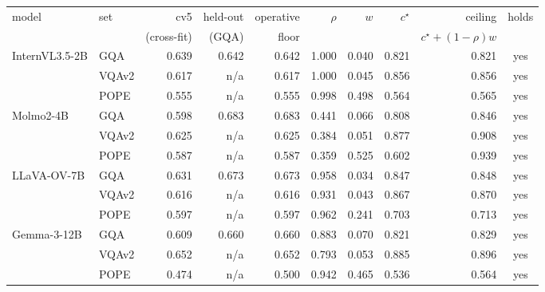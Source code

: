 \footnotesize
\setlength{\tabcolsep}{3.5pt}
\begin{tabular}{@{}llrrrrrrrc@{}}
\toprule
model & set & cv5 & held-out & operative & $\rho$ & $w$ & $c^{\star}$ & ceiling & holds \\
 &  & (cross-fit) & (GQA) & floor &  &  &  & $c^{\star}\!+\!(1\!-\!\rho)w$ &  \\
\midrule
\multirow{3}{*}{InternVL3.5-2B} & GQA & 0.639 & 0.642 & 0.642 & 1.000 & 0.040 & 0.821 & 0.821 & yes \\
 & VQAv2 & 0.617 & n/a & 0.617 & 1.000 & 0.045 & 0.856 & 0.856 & yes \\
 & POPE & 0.555 & n/a & 0.555 & 0.998 & 0.498 & 0.564 & 0.565 & yes \\
\midrule
\multirow{3}{*}{Molmo2-4B} & GQA & 0.598 & 0.683 & 0.683 & 0.441 & 0.066 & 0.808 & 0.846 & yes \\
 & VQAv2 & 0.625 & n/a & 0.625 & 0.384 & 0.051 & 0.877 & 0.908 & yes \\
 & POPE & 0.587 & n/a & 0.587 & 0.359 & 0.525 & 0.602 & 0.939 & yes \\
\midrule
\multirow{3}{*}{LLaVA-OV-7B} & GQA & 0.631 & 0.673 & 0.673 & 0.958 & 0.034 & 0.847 & 0.848 & yes \\
 & VQAv2 & 0.616 & n/a & 0.616 & 0.931 & 0.043 & 0.867 & 0.870 & yes \\
 & POPE & 0.597 & n/a & 0.597 & 0.962 & 0.241 & 0.703 & 0.713 & yes \\
\midrule
\multirow{3}{*}{Gemma-3-12B} & GQA & 0.609 & 0.660 & 0.660 & 0.883 & 0.070 & 0.821 & 0.829 & yes \\
 & VQAv2 & 0.652 & n/a & 0.652 & 0.793 & 0.053 & 0.885 & 0.896 & yes \\
 & POPE & 0.474 & n/a & 0.500 & 0.942 & 0.465 & 0.536 & 0.564 & yes \\
\bottomrule
\end{tabular}
